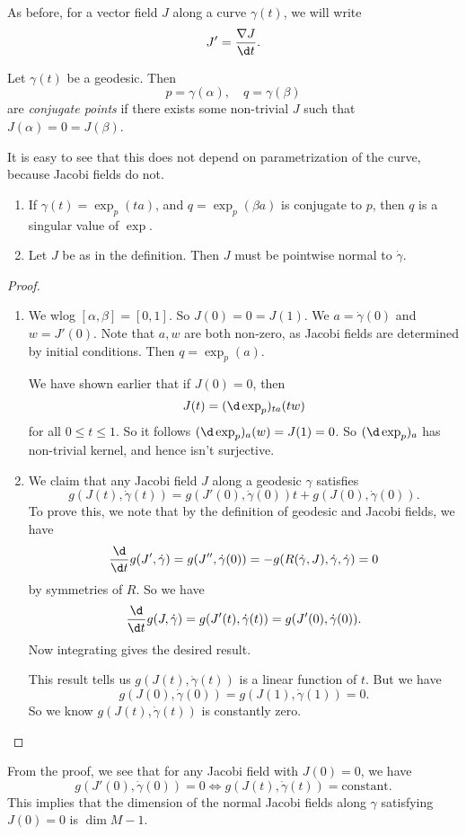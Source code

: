 \documentclass[a4paper]{article}
\begin{document}
As before, for a vector field $J$ along a curve $\gamma(t)$, we will write
\[
  J' = \frac{\nabla J}{\d t}.
\]
\begin{defi}
  Let $\gamma(t)$ be a geodesic. Then
  \[
    p = \gamma(\alpha), \quad q = \gamma(\beta)
  \]
  are \emph{conjugate points} if there exists some non-trivial $J$ such that $J(\alpha) = 0 = J(\beta)$.
\end{defi}
It is easy to see that this does not depend on parametrization of the curve, because Jacobi fields do not.

\begin{prop}\leavevmode
  \begin{enumerate}
    \item If $\gamma(t) = \exp_p(t a)$, and $q = \exp_p(\beta a)$ is conjugate to $p$, then $q$ is a singular value of $\exp$.
    \item Let $J$ be as in the definition. Then $J$ must be pointwise normal to $\dot{\gamma}$.
  \end{enumerate}
\end{prop}

\begin{proof}\leavevmode
  \begin{enumerate}
    \item We wlog $[\alpha, \beta] = [0, 1]$. So $J(0) = 0 = J(1)$. We $a = \dot{\gamma}(0)$ and $w = J'(0)$. Note that $a, w$ are both non-zero, as Jacobi fields are determined by initial conditions. Then $q = \exp_p(a)$.

      We have shown earlier that if $J(0) = 0$, then
      \[
        J(t) = (\d \exp_p)_{ta} (tw)
      \]
      for all $0 \leq t \leq 1$. So it follows $(\d \exp_p)_{a}(w) = J(1) = 0$. So $(\d \exp_p)_a$ has non-trivial kernel, and hence isn't surjective.
    \item We claim that any Jacobi field $J$ along a geodesic $\gamma$ satisfies
        \[
          g(J(t), \dot{\gamma}(t)) = g(J'(0), \dot{\gamma}(0)) t + g(J(0), \dot{\gamma}(0)).
        \]
      To prove this, we note that by the definition of geodesic and Jacobi fields, we have
      \[
        \frac{\d}{\d t} g(J', \dot{\gamma}) = g(J'', \dot{\gamma}(0)) = -g(R(\dot{\gamma}, J), \dot{\gamma}, \dot{\gamma}) = 0
      \]
      by symmetries of $R$. So we have
      \[
        \frac{\d}{\d t} g(J, \dot{\gamma}) = g(J'(t), \dot{\gamma}(t)) = g(J'(0), \dot{\gamma}(0)).
      \]
      Now integrating gives the desired result.

     This result tells us $g(J(t), \dot{\gamma}(t))$ is a linear function of $t$. But we have
      \[
        g(J(0), \dot{\gamma}(0)) = g(J(1), \dot{\gamma}(1)) = 0.
      \]
      So we know $g(J(t), \dot{\gamma}(t))$ is constantly zero.\qedhere
  \end{enumerate}
\end{proof}
From the proof, we see that for any Jacobi field with $J(0) = 0$, we have
\[
  g(J'(0), \dot{\gamma}(0)) = 0 \Longleftrightarrow g(J(t), \dot{\gamma}(t)) = \text{constant}.
\]
This implies that the dimension of the normal Jacobi fields along $\gamma$ satisfying $J(0) = 0$ is $\dim M - 1$.
\end{document}
